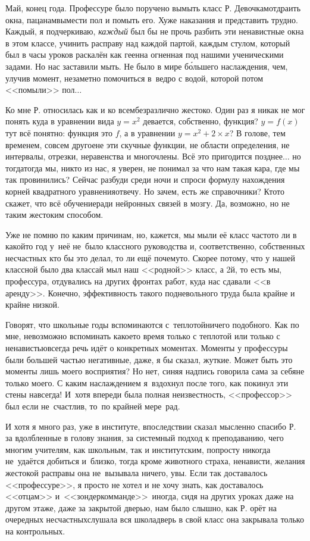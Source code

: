 Май, конец года. Профессуре было поручено вымыть класс Р. Девочкам\mdash отдраить окна, пацанам\mdash вымести пол и помыть его. Хуже наказания и представить трудно. Каждый, я подчеркиваю, \textit{каждый} был бы не прочь разбить эти ненавистные окна в этом классе, учинить расправу над каждой партой, каждым стулом, который был в часы уроков раскалён как геенна огненная под нашими ученическими задами. Но нас заставили мыть. Не было в мире б\'{о}льшего наслаждения, чем, улучив момент, незаметно помочиться в~ведро с водой, которой потом <<помыли>> пол$\ldots$

Ко мне Р. относилась как и ко всем\mdash безразлично жестоко. Один раз я никак не мог понять куда в уравнении вида ${y=x^2}$ девается, собственно, функция? ${y=f(x)}$\mdash тут всё понятно: функция это $f$, а в уравнении ${y=x^2 + 2\times x}$? В голове, тем временем, совсем другое\mdash не эти скучные функции, не области определения, не интервалы, отрезки, неравенства и многочлены. Всё это пригодится позднее$\ldots$ но тогда\mdash тогда мы, никто из нас, я уверен, не понимал за что нам такая кара, где мы так провинились? Сейчас разбуди среди ночи и спроси формулу нахождения корней квадратного уравнения\mdash отвечу. Но зачем, есть же справочники? Кто\sdash то скажет, что всё обучение\mdash ради нейронных связей в мозгу. Да, возможно, но не таким жестоким способом. 

Уже не помню по каким причинам, но, кажется, мы мыли её класс часто\mdash то ли в какой\sdash то год у~неё не~было классного руководства и, соответственно, собственных несчастных кто бы это делал, то ли ещё почему\sdash то. Скорее потому, что у нашей классной было два класса\sdash й мыл наш <<родной>> класс, а 2\sdash й, то есть мы, профессура, отдувались на других фронтах работ, куда нас сдавали <<в аренду>>. Конечно, эффективность такого подневольного труда была крайне и крайне низкой. 

Говорят, что школьные годы вспоминаются с~теплотой\mdash ничего подобного. Как по мне, невозможно вспоминать какое\sdash то время только с теплотой или только с ненавистью\mdash всегда речь идёт о конкретных моментах. Моменты у профессуры были большей частью негативные, даже, я бы сказал, жуткие. Может быть это моменты лишь моего восприятия? Но нет, синяя надпись говорила сама за себя\mdash не только моего. С каким наслаждением я~вздохнул после того, как покинул эти стены навсегда! И~хотя впереди была полная неизвестность, <<профессор>> был если не~счастлив, то~по крайней мере~рад. 

И хотя я много раз, уже в институте, впоследствии сказал мысленно спасибо Р. за вдолбленные в голову знания, за системный подход к преподаванию, чего многим учителям, как школьным, так и институтским, попросту никогда не~удаётся добиться и~близко, тогда кроме животного страха, ненависти, желания жестокой расправы она не~вызывала ни\sdash че\sdash го, увы. Если так доставалось <<профессуре>>, я просто не хотел и не хочу знать, как доставалось <<отцам>> и~<<зондеркомманде>>~\cite{ГеографГлобусПропил}\mdash иногда, сидя на других уроках даже на другом этаже, даже за закрытой дверью, нам было слышно, как Р. орёт на очередных несчастных\mdash слушала вся школа\mdash дверь в свой класс она закрывала только на контрольных.

